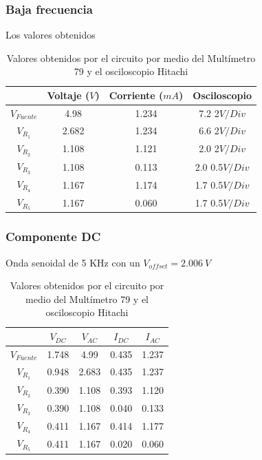 \documentclass[twocolumn]{IEEEtran}
\begin{document}
\subsubsection{Baja frecuencia}
Los valores obtenidos
\begin{table}[H]
	\centering
\begin{tabular}[c]{|c|c|c|c|} \hline
 & Voltaje ($V$) & Corriente ($mA$) & Osciloscopio \\ \hline
$V_{Fuente}$ & 4.98 & 1.234 & 7.2 2$V/Div$ \\ \hline
$V_{R_{1}}$ & 2.682 & 1.234 & 6.6 2$V/Div$ \\ \hline
$V_{R_{2}}$ & 1.108 & 1.121 & 2.0 2$V/Div$ \\ \hline
$V_{R_{3}}$ & 1.108 & 0.113 & 2.0 0.5$V/Div$ \\ \hline
$V_{R_{4}}$ & 1.167 & 1.174 & 1.7 0.5$V/Div$ \\ \hline
$V_{R_{5}}$ & 1.167 & 0.060 & 1.7 0.5$V/Div$ \\ \hline
\end{tabular}
	\caption{Valores obtenidos por el circuito por medio del Multímetro 79 y
el osciloscopio Hitachi}
	\label{tab6}
\end{table}
\noindent

\subsubsection{Componente DC}
Onda senoidal de 5 KHz con un $V_{offset}=2.006 \ V$
\begin{table}[h]
	\centering
\begin{tabular}[c]{|c|c|c|c|c|} \hline
 & $V_{DC}$ & $V_{AC}$ & $I_{DC}$ & $I_{AC}$ \\ \hline
$V_{Fuente}$ & 1.748 & 4.99 & 0.435 & 1.237 \\ \hline
$V_{R_{1}}$ & 0.948 & 2.683 & 0.435 & 1.237 \\ \hline
$V_{R_{2}}$ & 0.390 & 1.108 & 0.393 & 1.120 \\ \hline
$V_{R_{3}}$ & 0.390 & 1.108 & 0.040 & 0.133 \\ \hline
$V_{R_{4}}$ & 0.411 & 1.167 & 0.414 & 1.177 \\ \hline
$V_{R_{5}}$ & 0.411 & 1.167 & 0.020 & 0.060 \\ \hline
\end{tabular}
	\caption{Valores obtenidos por el circuito por medio del Multímetro 79 y
el osciloscopio Hitachi}
	\label{tab7}
\end{table}
\noindent
\end{document}
